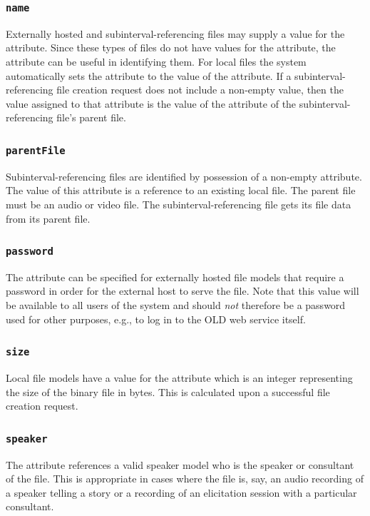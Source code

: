 \documentclass[letterpaper,10pt,english]{sphinxmanual}
\begin{document}
\subsubsection{\texttt{name}}
\label{datastructure:id15}
Externally hosted and subinterval-referencing files may supply a value for the
 attribute.  Since these types of files do not have values for the
 attribute, the  attribute can be useful in identifying
them.  For local files the system automatically sets the  attribute to
the value of the  attribute.  If a subinterval-referencing file
creation request does not include a non-empty  value, then the value
assigned to that attribute is the value of the  attribute of the
subinterval-referencing file's parent file.


\subsubsection{\texttt{parentFile}}
\label{datastructure:parentfile}
Subinterval-referencing files are identified by possession of a non-empty
 attribute.  The value of this attribute is a reference to an
existing local file.  The parent file must be an audio or video file.  The
subinterval-referencing file gets its file data from its parent file.


\subsubsection{\texttt{password}}
\label{datastructure:password}
The  attribute can be specified for externally hosted file models
that require a password in order for the external host to serve the file.  Note
that this value will be available to all users of the system and should \emph{not}
therefore be a password used for other purposes, e.g., to log in to the OLD web
service itself.


\subsubsection{\texttt{size}}
\label{datastructure:size}
Local file models have a value for the  attribute which is an integer
representing the size of the binary file in bytes.  This is calculated upon a
successful file creation request.


\subsubsection{\texttt{speaker}}
\label{datastructure:id16}
The  attribute references a valid speaker model who is the speaker or
consultant of the file.  This is appropriate in cases where the file is, say,
an audio recording of a speaker telling a story or a recording of an
elicitation session with a particular consultant.
\end{document}
